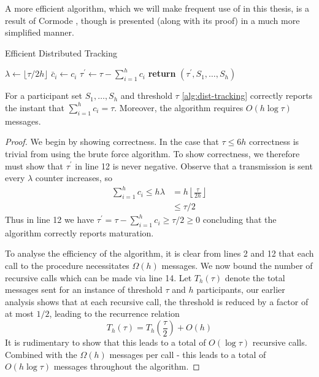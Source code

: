A more efficient algorithm, which we will make frequent use of in this thesis, is a result of Cormode \cite{Cormode2011}, though is presented (along with its proof) in a much more simplified manner.  
\begin{algorithm}
\caption{Efficient Distributed Tracking}\label{alg:dist-tracking}
\begin{algorithmic}[1]
    \State {}
\EndIf
\State {} $\lambda \leftarrow \lfloor \tau/2h\rfloor$
\State {}
\State {}
\State $\bar{c}_i \gets c_i$
\EndIf
\State {} $\tau^\prime\leftarrow\tau-\sum_{i=1}^{h}c_i$
\EndFor
\State \textbf{return} $(\tau^\prime, S_1,\dots,S_h)$ 
\EndProcedure
\end{algorithmic}
\end{algorithm}

\begin{theorem}  For a participant set $S_1,\dots, S_h$ and threshold $\tau$ \cref{alg:dist-tracking} correctly reports the instant that $\sum_{i=1}^{h}c_i = \tau$. Moreover, the algorithm requires $O(h\log\tau)$ messages.
\end{theorem}
\begin{proof}
We begin by showing correctness. In the case that $\tau\leq6h$ correctness is trivial from using the brute force algorithm. To show correctness, we therefore must show that $\tau^\prime$ in line 12 is never negative. Observe that a transmission is sent every $\lambda$ counter increases, so 
\begin{align*}
    \sum_{i=1}^{h}c_i \leq h\lambda &= h \left\lfloor\frac{\tau}{2h} \right\rfloor \\
    &\leq \tau/2
\end{align*}
Thus in line 12 we have $\tau^\prime = \tau - \sum_{i=1}^{h}c_i\geq\tau/2 \geq 0$ concluding that the algorithm correctly reports maturation.

To analyse the efficiency of the algorithm, it is clear from lines 2 and 12 that each call to the procedure necessitates $\Omega(h)$ messages. We now bound the number of recursive calls which can be made via line 14. Let $T_h(\tau)$ denote the total messages sent for an instance of threshold $\tau$ and $h$ participants, our earlier analysis shows that at each recursive call, the threshold is reduced by a factor of at most $1/2$, leading to the recurrence relation
$$T_h(\tau) = T_h\left(\frac{\tau}{2}\right) + O(h)$$
It is rudimentary to show that this leads to a total of $O(\log\tau)$ recursive calls. Combined with the $\Omega(h)$ messages per call - this leads to a total of $O(h\log\tau)$ messages throughout the algorithm.
\end{proof}
